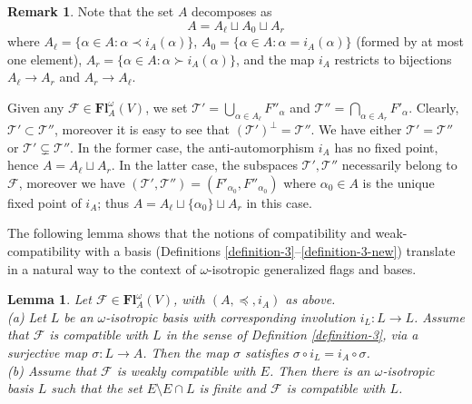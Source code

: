 \documentclass[12pt]{amsart}
\newtheorem{lemma}{Lemma}
\theoremstyle{definition}
\newtheorem{remark}{Remark}
\begin{document}
\begin{remark}
Note that the set $A$ decomposes as
\[A=A_\ell\sqcup A_0\sqcup A_r\]
where $A_\ell=\{\alpha\in A:\alpha\prec i_A(\alpha)\}$,
$A_0=\{\alpha\in A:\alpha= i_A(\alpha)\}$ (formed by at most one element), $A_r=\{\alpha\in A:\alpha\succ i_A(\alpha)\}$,
and the map $i_A$ restricts to bijections $A_\ell\to A_r$ and $A_r\to A_\ell$.

Given any $\mathcal{F}\in\mathbf{Fl}_A^\omega(V)$, we set
 $\mathcal{T}'=\bigcup_{\alpha\in A_\ell} F''_\alpha$
and $\mathcal{T}''=\bigcap_{\alpha\in A_r} F'_\alpha$.
Clearly, $\mathcal{T}'\subset \mathcal{T}''$, moreover it is easy to see that $(\mathcal{T}')^\perp=\mathcal{T}''$. We have either $\mathcal{T}'=\mathcal{T}''$ or $\mathcal{T}'\varsubsetneq\mathcal{T}''$. In the former case, the anti-automorphism $i_A$ has no fixed point, hence $A=A_\ell\sqcup A_r$. In the latter case, the subspaces $\mathcal{T}',\mathcal{T}''$ necessarily belong to $\mathcal{F}$, moreover we have $(\mathcal{T}',\mathcal{T}'')=(F'_{\alpha_0},F''_{\alpha_0})$ where $\alpha_0\in A$ is the unique fixed point of $i_A$; thus $A=A_\ell\sqcup\{\alpha_0\}\sqcup A_r$ in this case.
\end{remark}

The following lemma shows that the notions of compatibility and weak-compatibility with a basis (Definitions \ref{definition-3}--\ref{definition-3-new}) translate in a natural way to the context of $\omega$-isotropic generalized flags and bases.

\begin{lemma}
\label{lemma-1-new}
Let $\mathcal{F}\in\mathbf{Fl}_A^\omega(V)$, with $(A,\preceq,i_A)$ as above. \\
{\rm (a)}
Let $L$ be an $\omega$-isotropic basis with corresponding involution $i_L:L\to L$.
Assume that $\mathcal{F}$ is compatible with $L$ in the sense of Definition \ref{definition-3}, via a surjective map $\sigma:L\to A$.
Then the map $\sigma$ satisfies $\sigma\circ i_L=i_A\circ \sigma$. \\
{\rm (b)}
Assume that $\mathcal{F}$ is weakly compatible with $E$. Then there is an $\omega$-isotropic basis $L$ such that the set $E\setminus E\cap L$ is finite and $\mathcal{F}$ is compatible with $L$.
\end{lemma}
\end{document}
